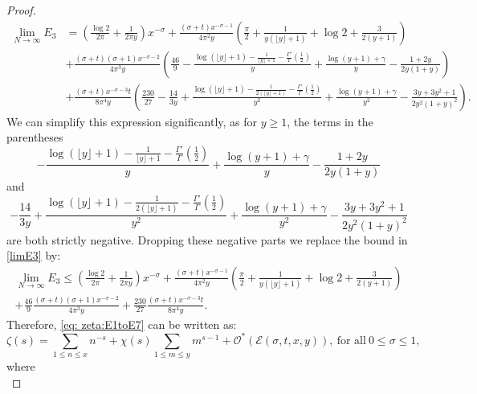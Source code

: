 \documentclass[11pt,letterpaper,oneside,reqno]{amsart}
\renewcommand{\^}[1]{\widehat{#1}}
\newcommand{\s}{\sigma}
\numberwithin{equation}{section}
\theoremstyle{remark}
\begin{document}
\begin{proof}
\begin{equation} \label{limE3}
\begin{aligned}
     \lim_{N \to \infty}E_3
     &
= \left(\frac{\log 2}{2\pi} + \frac{1}{2\pi y}\right)  x^{-\sigma} 
+ \frac{(\sigma + t)x^{-\sigma - 1}}{4\pi^2y }\left(\frac{\pi}{2}  + \frac{1}{y(\lfloor y \rfloor+1)} + \log 2+\frac{3}{2(y+1)}\right) \\ 
&  + \frac{(\sigma + t)(\sigma + 1)x^{-\sigma - 2}}{4\pi^3y}  \left(\frac{46}{9} - \frac{\log(\lfloor y \rfloor+ 1) - \frac{1}{\lfloor y \rfloor + 1} - \frac{\Gamma'}{\Gamma}(\frac{1}{2})}{y} + \frac{\log(y + 1) + \gamma}{y} - \frac{1+2y}{2y(1+y)} \right) \\ 
&  + \frac{(\sigma + t)x^{-\sigma - 3}t}{8\pi^4y} \left(\frac{230}{27} - \frac{14}{3y} + \frac{\log(\lfloor y \rfloor+ 1) - \frac{1}{2(\lfloor y \rfloor + 1)} - \frac{\Gamma'}{\Gamma}(\frac{1}{2})}{y^2} + \frac{\log(y+ 1) + \gamma}{y^2} - \frac{3y + 3y^2 + 1}{2y^2(1+y)^2} \right).
\end{aligned}
\end{equation}
%
We can simplify this expression significantly, as for $y  \geq 1$, the terms in the parentheses
\[ - \frac{\log(\lfloor y \rfloor+ 1) - \frac{1}{\lfloor y \rfloor + 1} - \frac{\Gamma'}{\Gamma}(\frac{1}{2})}{y}+ \frac{\log(y + 1) + \gamma}{y} - \frac{1+2y}{2y(1+y)} \]
and 
\[- \frac{14}{3y} + \frac{\log(\lfloor y \rfloor+ 1) - \frac{1}{2(\lfloor y\rfloor + 1)} - \frac{\Gamma'}{\Gamma}(\frac{1}{2})}{y^2}+\frac{\log(y+ 1) + \gamma}{y^2} - \frac{3y + 3y^2 + 1}{2y^2(1+y)^2} \]
are both strictly negative. Dropping these negative parts we replace the bound in \eqref{limE3} by:
\begin{multline}\label{bnd-E3}
 \lim_{N\to \infty} E_3 \leq  \left(\frac{\log 2}{2\pi} + \frac{1}{2\pi y}\right) x^{-\sigma} + \frac{(\sigma + t)x^{-\sigma - 1}}{4\pi^2 y}\left(\frac{\pi}{2} + \frac{1}{y(\lfloor y \rfloor+1)} + \log 2+\frac{3}{2(y+1)}\right)\\
 + \frac{46}{9} \frac{(\sigma + t)(\sigma + 1)x^{-\sigma - 2}}{4\pi^3y} + \frac{230}{27} \frac{(\sigma + t)x^{-\sigma - 3}t}{8\pi^4y} .
\end{multline}
%
Therefore, \eqref{eq: zeta:E1toE7} can be written as:
\begin{equation}
    \zeta(s) = \sum_{1 \leq n \leq x} n^{-s} + \chi(s) \sum_{1 \leq m \leq y} m^{s-1} +\mathcal{O}^*(\mathcal{E}(\s,t,x,y)), \ \text{for all}\ 0\le \sigma \le 1, \label{eq:AFE-2}
\end{equation}
where
\begin{equation}

\end{equation}
\end{proof}
\end{document}
